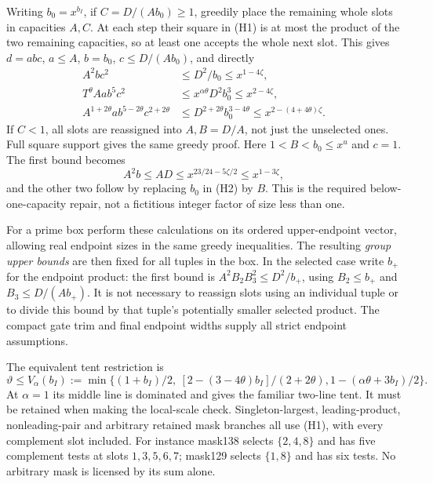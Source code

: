 Writing $b_0=x^{b_I}$, if $C=D/(Ab_0)\ge1$, greedily place the remaining
whole slots in capacities $A,C$. At each step their square in (H1) is
at most the product of the two remaining capacities, so at least one
accepts the whole next slot. This gives $d=abc$, $a\le A$, $b=b_0$,
$c\le D/(Ab_0)$, and directly
\begin{align*}
 A^2bc^2&\le D^2/b_0\le x^{1-4\zeta},\\
 T^\theta Aab^5c^2&\le x^{\alpha\theta}D^2b_0^3
                         \le x^{2-4\zeta},\\
 A^{1+2\theta}ab^{5-2\theta}c^{2+2\theta}
 &\le D^{2+2\theta}b_0^{3-4\theta}
                         \le x^{2-(4+4\theta)\zeta}.       \tag{H2}
\end{align*}
If $C<1$, all slots are reassigned into $A,B=D/A$, not just the
unselected ones. Full square support gives the same greedy proof.
Here $1<B<b_0\le x^u$ and $c=1$. The first bound becomes
\[
 A^2b\le AD\le x^{23/24-5\zeta/2}\le x^{1-3\zeta},
\]
and the other two follow by replacing $b_0$ in (H2) by $B$.
This is the required below-one-capacity repair, not a fictitious
integer factor of size less than one.

For a prime box perform these calculations on its ordered upper-endpoint
vector, allowing real endpoint sizes in the same greedy inequalities.
The resulting \emph{group upper bounds} are then fixed for all tuples
in the box. In the selected case write $b_+$ for the endpoint product:
the first bound is $A^2 B_2B_3^2\le D^2/b_+$, using
$B_2\le b_+$ and $B_3\le D/(Ab_+)$. It is not necessary to
reassign slots using an individual tuple or to divide this bound by
that tuple's potentially smaller selected product. The compact gate
trim and final endpoint widths supply all strict endpoint assumptions.

The equivalent tent restriction is
\[
 \vartheta\le V_\alpha(b_I):=
 \min\{(1+b_I)/2,\ [2-(3-4\theta)b_I]/(2+2\theta),
                 1-(\alpha\theta+3b_I)/2\}.              \tag{H3}
\]
At $\alpha=1$ its middle line is dominated and gives the familiar
two-line tent. It must be retained when making the local-scale check.
Singleton-largest, leading-product, nonleading-pair and arbitrary
retained mask branches all use (H1), with every complement slot included.
For instance mask138 selects $\{2,4,8\}$ and has five complement tests
at slots $1,3,5,6,7$; mask129 selects $\{1,8\}$ and has six tests.
No arbitrary mask is licensed by its sum alone.

